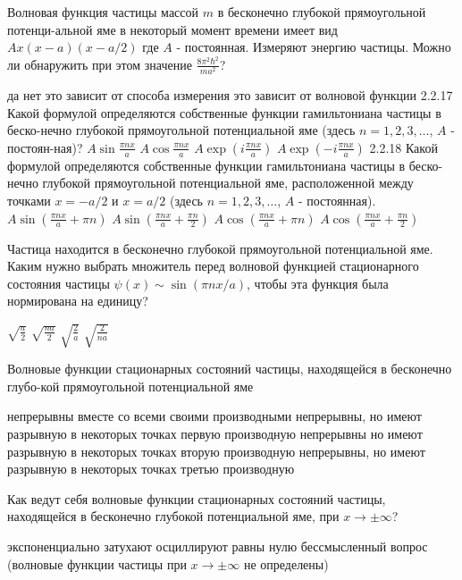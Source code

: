 \documentclass[11pt,a4paper]{exam}
\begin{document}
\begin{questions}
\question Волновая функция частицы массой $m$ в бесконечно глубокой прямоугольной потенци-альной яме в некоторый момент времени имеет вид $Ax(x - a)(x - a/2)$ где $A$ - постоянная. Измеряют энергию частицы. Можно ли обнаружить при этом значение $\frac{{8{\pi ^2}{\hbar ^2}}}{{m{a^2}}}$?
\begin{choices}
\choice да                
\choice нет
\choice это зависит от способа измерения 
\choice это зависит от волновой функции
2.2.17 Какой формулой определяются собственные функции гамильтониана частицы в беско-нечно глубокой прямоугольной потенциальной яме (здесь $n = 1,2,3, \ldots $, $A$ - постоян-ная)?
\choice $A\sin \frac{{\pi nx}}{a}$    
\choice $A\cos \frac{{\pi nx}}{a}$    
\choice $A\exp \left( {i\frac{{\pi nx}}{a}} \right)$    
\choice $A\exp \left( { - i\frac{{\pi nx}}{a}} \right)$ 
2.2.18 Какой формулой определяются собственные функции гамильтониана частицы в беско-нечно глубокой прямоугольной потенциальной яме, расположенной между точками $x =  - a/2$ и $x = a/2$ (здесь $n = 1,2,3, \ldots $, $A$ - постоянная).
\choice $A\sin \left( {\frac{{\pi nx}}{a} + \pi n} \right)$         
\choice $A\sin \left( {\frac{{\pi nx}}{a} + \frac{{\pi n}}{2}} \right)$
\choice $A\cos \left( {\frac{{\pi nx}}{a} + \pi n} \right)$         
\choice $A\cos \left( {\frac{{\pi nx}}{a} + \frac{{\pi n}}{2}} \right)$
\end{choices}

\question Частица находится в бесконечно глубокой прямоугольной потенциальной яме. Каким нужно выбрать множитель перед волновой функцией стационарного состояния частицы $\psi (x) \sim \sin \left( {\pi nx/a} \right)$, чтобы эта функция была нормирована на единицу?
\begin{choices}
\choice $\sqrt {\frac{a}{2}} $        
\choice $\sqrt {\frac{{na}}{2}} $     
\choice $\sqrt {\frac{2}{a}} $        
\choice $\sqrt {\frac{2}{{na}}} $
\end{choices}

\question Волновые функции стационарных состояний частицы, находящейся в бесконечно глубо-кой прямоугольной потенциальной яме
\begin{choices}
\choice непрерывны вместе со всеми своими производными
\choice непрерывны, но имеют разрывную в некоторых точках первую производную
\choice непрерывны но имеют разрывную в некоторых точках вторую производную
\choice непрерывны, но имеют разрывную в некоторых точках третью производную
\end{choices}

\question Как ведут себя волновые функции стационарных состояний частицы, находящейся в бесконечно глубокой потенциальной яме, при $x \to  \pm \infty $?
\begin{choices}
\choice экспоненциально затухают
\choice осциллируют
\choice равны нулю
\choice бессмысленный вопрос (волновые функции частицы при $x \to  \pm \infty $ не определены)
\end{choices}


\end{questions}
\end{document}
